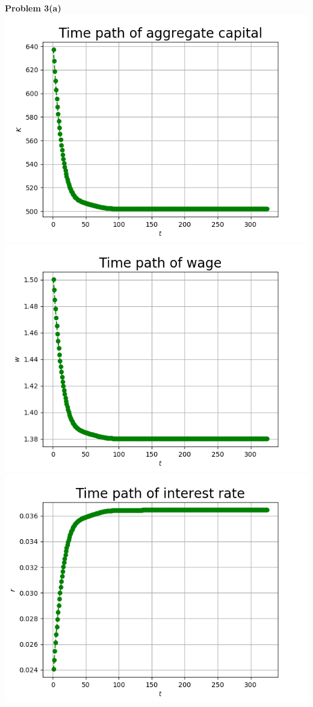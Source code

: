 \documentclass[letterpaper,12pt]{article}
\theoremstyle{definition}
\begin{document}
\noindent\textbf{Problem 3(a)}\\
\includegraphics[scale=0.5]{kplot}
\includegraphics[scale=0.5]{wplot}
\includegraphics[scale=0.5]{rplot}
\end{document}
